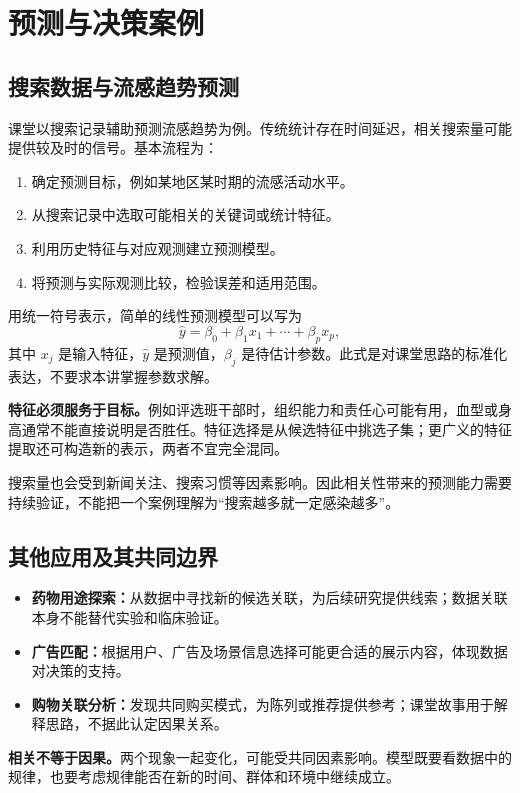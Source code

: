 \documentclass[UTF8,fontset=fandol,a4paper,12pt]{ctexart}
\theoremstyle{definition}
\begin{document}
\section{预测与决策案例}
\subsection{搜索数据与流感趋势预测}
课堂以搜索记录辅助预测流感趋势为例。传统统计存在时间延迟，相关搜索量可能提供较及时的信号。基本流程为：
\begin{enumerate}
\item 确定预测目标，例如某地区某时期的流感活动水平。
\item 从搜索记录中选取可能相关的关键词或统计特征。
\item 利用历史特征与对应观测建立预测模型。
\item 将预测与实际观测比较，检验误差和适用范围。
\end{enumerate}
用统一符号表示，简单的线性预测模型可以写为
\[
\widehat y=\beta_0+\beta_1x_1+\cdots+\beta_px_p,
\]
其中 $x_j$ 是输入特征，$\widehat y$ 是预测值，$\beta_j$ 是待估计参数。此式是对课堂思路的标准化表达，不要求本讲掌握参数求解。

\textbf{特征必须服务于目标。}例如评选班干部时，组织能力和责任心可能有用，血型或身高通常不能直接说明是否胜任。特征选择是从候选特征中挑选子集；更广义的特征提取还可构造新的表示，两者不宜完全混同。

搜索量也会受到新闻关注、搜索习惯等因素影响。因此相关性带来的预测能力需要持续验证，不能把一个案例理解为“搜索越多就一定感染越多”。

\subsection{其他应用及其共同边界}
\begin{itemize}
\item \textbf{药物用途探索：}从数据中寻找新的候选关联，为后续研究提供线索；数据关联本身不能替代实验和临床验证。
\item \textbf{广告匹配：}根据用户、广告及场景信息选择可能更合适的展示内容，体现数据对决策的支持。
\item \textbf{购物关联分析：}发现共同购买模式，为陈列或推荐提供参考；课堂故事用于解释思路，不据此认定因果关系。
\end{itemize}
\textbf{相关不等于因果。}两个现象一起变化，可能受共同因素影响。模型既要看数据中的规律，也要考虑规律能否在新的时间、群体和环境中继续成立。

\newpage
\end{document}
